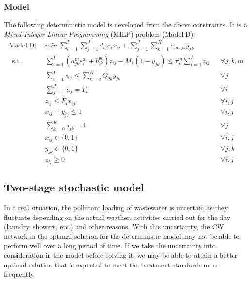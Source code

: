 \documentclass[preprint,12pt,authoryear]{elsarticle}
\begin{document}
\subsubsection{Model}
The following deterministic model is developed from the above constraints. It is a \emph{Mixed-Integer Linear Programming} (MILP) problem (Model D):
\setcounter{equation}{0}
\begin{align}\label{model:D}
	\text{Model D}:~~&min ~ \sum_{i=1}^{I}\sum_{j=1}^{J}d_{ij}c_s x_{ij} + \sum_{j=1}^{J}\sum_{k=1}^{K}c_{cw,jk}y_{jk}\nonumber\\~~
	\mbox{s.t.}~~
	&\sum_{i=1}^{I} (a_{jk}^m \varepsilon_i^m + b_{jk}^m) z_{ij} - M_1(1 - y_{jk}) \leq \tau_j^m \sum_{i=1}^I z_{ij}  && \forall j,k,m\\
 	&\sum_{i=1}^{I} z_{ij} \leq \sum_{k=0}^K Q_{jk} y_{jk} && \forall j\\
	&\sum_{j=1}^J z_{ij} = F_i && \forall i\\
	&z_{ij} \leq F_i x_{ij} && \forall i,j\\
	&x_{ij} + y_{j0} \leq 1 && \forall i,j\\
	&\sum_{k=0}^{K}y_{jk} = 1&&\forall j\\
	&x_{ij} \in \{0,1\}&&\forall i,j\\
	&y_{jk} \in \{0,1\}&&\forall j,k\\
	&z_{ij} \geq 0&&\forall i,j
\end{align}
\renewcommand{\theequation}{\thesection--\arabic{equation}}
\setcounter{equation}{13}
\subsection{Two-stage stochastic model}\label{stomodel}
In a real situation, the pollutant loading of wastewater is uncertain as they fluctuate depending on the actual weather, activities carried out for the day (laundry, showers, etc.) and other reasons. With this uncertainty, the CW network in the optimal solution for the deterministic model may not be able to perform well over a long period of time. If we take the uncertainty into consideration in the model before solving it, we may be able to attain a better optimal solution that is expected to meet the treatment standards more frequently. 
\end{document}

